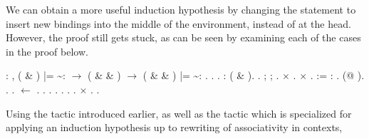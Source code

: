 \documentclass[12pt]{report}
\begin{document}
    We can obtain a more useful induction hypothesis by changing the
    statement to insert new bindings into the middle of the
    environment, instead of at the head.  However, the proof still
    gets stuck, as can be seen by examining each of the cases in
    the proof below. 
\begin{coqdoccode}
\coqdocemptyline
\coqdocnoindent
{}  : \coqdockw{\ensuremath{\forall}}     ,\coqdoceol
\coqdocindent{1.50em}
( \& ) |=  \~{}:  \ensuremath{\rightarrow} \coqdoceol
\coqdocindent{1.50em}
 ( \&  \& ) \ensuremath{\rightarrow}\coqdoceol
\coqdocindent{1.50em}
( \&  \& ) |=  \~{}: .\coqdoceol
\coqdocnoindent
{}.\coqdoceol
\coqdocindent{1.00em}
 .\coqdoceol
\coqdocindent{1.00em}
 : ( \& ).  .\coqdoceol
\coqdocindent{1.00em}
 ;    ; .\coqdoceol
\coqdocindent{1.00em}
\ensuremath{\times} . \ensuremath{\times} .\coqdoceol
\coqdocindent{1.00em}
  :=    : .\coqdoceol
\coqdocindent{1.00em}
 (@ ).\coqdoceol
\coqdocindent{1.00em}
  .  .\coqdoceol
\coqdocindent{1.00em}
 \ensuremath{\leftarrow} .\coqdoceol
\coqdocindent{1.00em}
 .\coqdoceol
\coqdocindent{2.00em}
. \coqdocindent{2.00em}
 . .\coqdoceol
\coqdocindent{2.00em}
 . .\coqdoceol
\coqdocindent{1.00em}
\ensuremath{\times} .\coqdoceol
\coqdocnoindent
{}.\coqdoceol
\coqdocemptyline
\end{coqdoccode}
Using the tactic  introduced earlier, as well as
    the tactic  which is specialized for applying an
    induction hypothesis up to rewriting of associativity in contexts,
\end{document}
